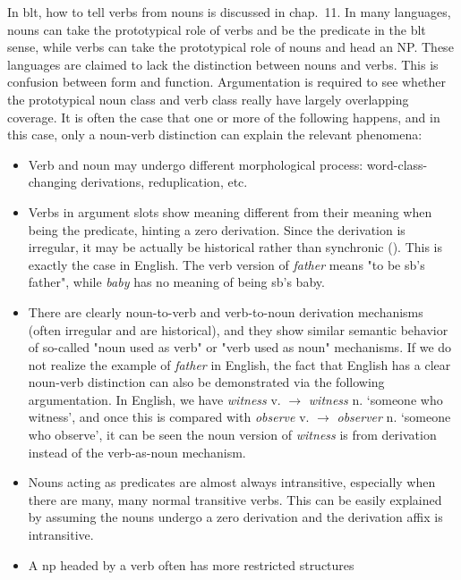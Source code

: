 \documentclass[UTF8, a4paper, oneside, scheme=plain]{ctexart}
\newcommand*{\citechap}[1]{chap.~{#1}}
\newcommand*{\corpus}[1]{\emph{#1}}
\newcommand*{\translate}[1]{`#1'}
\begin{document}
In \ac{blt}, how to tell verbs from nouns is discussed in \citechap{11}. 
In many languages, nouns can take the prototypical role of verbs and be the predicate in the \ac{blt} sense, 
while verbs can take the prototypical role of nouns and head an NP.  %
These languages are claimed to lack the distinction between nouns and verbs. 
This is confusion between form and function.
Argumentation is required to see whether the prototypical noun class and verb class
really have largely overlapping coverage.
It is often the case that one or more of the following
happens, and in this case,
only a noun-verb distinction can explain the relevant phenomena: 
\begin{itemize}
    \item Verb and noun may undergo different morphological process: word-class-changing derivations, reduplication, etc.
    \item Verbs in argument slots show meaning different from their meaning when being the predicate,
    hinting a zero derivation.
    Since the derivation is irregular, 
    it may be actually be historical rather than synchronic ().
    This is exactly the case in English. 
    The verb version of \corpus{father} means "to be sb's father", 
    while \corpus{baby} has no meaning of being sb's baby.
    \item There are clearly noun-to-verb and verb-to-noun derivation mechanisms
    (often irregular and are historical), 
    and they show similar semantic behavior of so-called "noun used as verb" or "verb used as noun" mechanisms.
    If we do not realize the example of \corpus{father} in English,
    the fact that English has a clear noun-verb distinction 
    can also be demonstrated via the following argumentation.
    In English, we have
    \corpus{witness} v. $\to$ \corpus{witness} n. \translate{someone who witness},
    and once this is compared with 
    \corpus{observe} v. $\to$ \corpus{observer} n. \translate{someone who observe},
    it can be seen the noun version of \corpus{witness}
    is from derivation instead of the verb-as-noun mechanism.
    \item Nouns acting as predicates are almost always intransitive, 
    especially when there are many, many normal transitive verbs. 
    This can be easily explained by 
    assuming the nouns undergo a zero derivation and the derivation affix is intransitive. 
    \item A \ac{np} headed by a verb often has more restricted structures 

\end{itemize}
\end{document}

